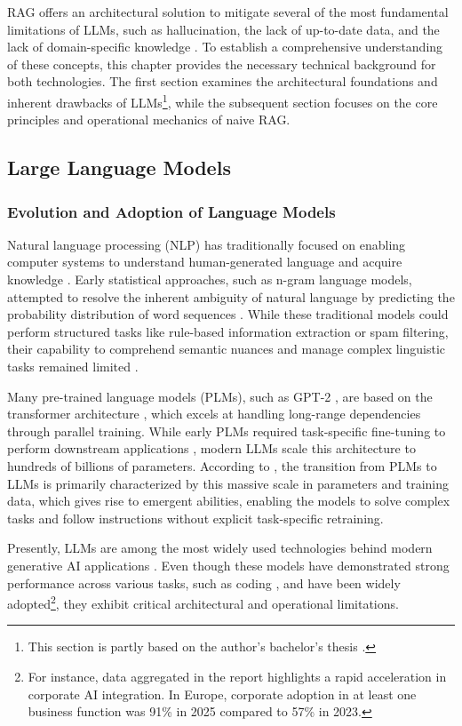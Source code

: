 RAG offers an architectural solution to mitigate several of the most fundamental limitations of LLMs, such as hallucination, the lack of up-to-date data, and the lack of domain-specific knowledge \cite{wu2025ragnlp}. To establish a comprehensive understanding of these concepts, this chapter provides the necessary technical background for both technologies. The first section examines the architectural foundations and inherent drawbacks of LLMs\footnote{This section is partly based on the author's bachelor's thesis \cite{asunmaa2025large}.}, while the subsequent section focuses on the core principles and operational mechanics of naive RAG.

\subsection{Large Language Models}
\label{chapter:LLM}

\subsubsection{Evolution and Adoption of Language Models}
Natural language processing (NLP) has traditionally focused on enabling computer systems to understand human-generated language and acquire knowledge \cite{RussellNorvig2010}. Early statistical approaches, such as n-gram language models, attempted to resolve the inherent ambiguity of natural language by predicting the probability distribution of word sequences \cite{RussellNorvig2010}. While these traditional models could perform structured tasks like rule-based information extraction or spam filtering, their capability to comprehend semantic nuances and manage complex linguistic tasks remained limited \cite{LLMSurvey}.

Many pre-trained language models (PLMs), such as GPT-2 \cite{radford2019language}, are based on the transformer architecture \cite{Vaswani2017}, which excels at handling long-range dependencies through parallel training. While early PLMs required task-specific fine-tuning to perform downstream applications \cite{bommasani2021opportunities}, modern LLMs scale this architecture to hundreds of billions of parameters. According to \citet{LLMSurvey}, the transition from PLMs to LLMs is primarily characterized by this massive scale in parameters and training data, which gives rise to emergent abilities, enabling the models to solve complex tasks and follow instructions without explicit task-specific retraining.

Presently, LLMs are among the most widely used technologies behind modern generative AI applications \citep{LLMSurvey}. Even though these models have demonstrated strong performance across various tasks, such as coding \citep{Coignion_2024}, and have been widely adopted\footnote{For instance, data aggregated in the report \cite{StanfordAIIndex2026} highlights a rapid acceleration in corporate AI integration. In Europe, corporate adoption in at least one business function was 91\% in 2025 compared to 57\% in 2023.}, they exhibit critical architectural and operational limitations. 


